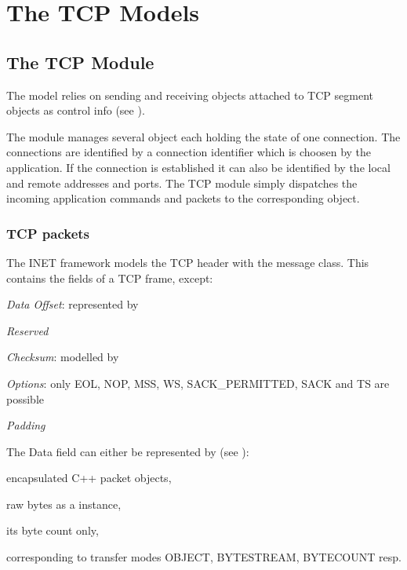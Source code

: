\chapter{The TCP Models}
\label{cha:tcp}

\section{The TCP Module}

The  model relies on sending and receiving  objects
attached to TCP segment objects as control info (see ).

The  module manages several  object each
holding the state of one connection. The connections are identified
by a connection identifier which is choosen by the application.
If the connection is established it can also be identified by
the local and remote addresses and ports. The TCP module simply
dispatches the incoming application commands and packets to
the corresponding object.

\subsection{TCP packets}
\label{subsec:tcp_packets}

The INET framework models the TCP header with the  message class.
This contains the fields of a TCP frame, except:
\begin{compactitem}
  \item \emph{Data Offset}: represented by 
  \item \emph{Reserved}
  \item \emph{Checksum}: modelled by 
  \item \emph{Options}: only EOL, NOP, MSS, WS, SACK\_PERMITTED, SACK and TS are possible
  \item \emph{Padding}
\end{compactitem}

The Data field can either be represented by (see ):
\begin{compactitem}
  \item encapsulated C++ packet objects,
  \item raw bytes as a  instance,
  \item its byte count only,
\end{compactitem}
corresponding to transfer modes OBJECT, BYTESTREAM, BYTECOUNT resp.


